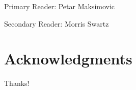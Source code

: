 \documentclass[12pt]{report}
\begin{document}
\vspace{15mm}

\noindent Primary Reader: Petar Maksimovic

\noindent Secondary Reader: Morris Swartz

\chapter*{Acknowledgments}
Thanks!
%
%

\pagestyle{plain}
\tableofcontents
\listoftables
\listoffigures

\cleardoublepage %


%
%




%

 

%
%
%




%
\end{document}
